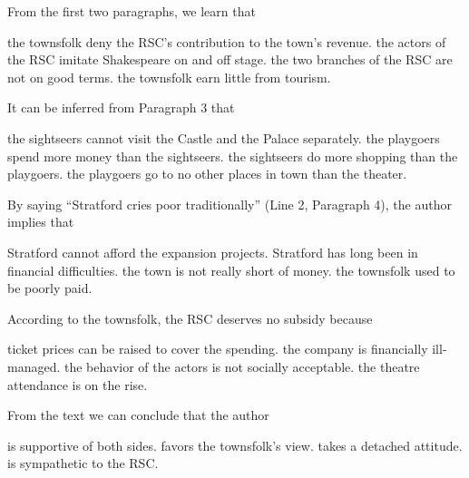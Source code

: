 \item From the first two paragraphs, we learn that
\begin{tasks}
	\task the townsfolk deny the RSC's contribution to the town's revenue.
	\task the actors of the RSC imitate Shakespeare on and off stage.
	\task the two branches of the RSC are not on good terms.
	\task the townsfolk earn little from tourism.
\end{tasks}
\item It can be inferred from Paragraph 3 that
\begin{tasks}
	\task the sightseers cannot visit the Castle and the Palace separately.
	\task the playgoers spend more money than the sightseers.
	\task the sightseers do more shopping than the playgoers.
	\task the playgoers go to no other places in town than the theater.
\end{tasks}
\item By saying ``Stratford cries poor traditionally'' (Line 2, Paragraph 4), the author implies that
\begin{tasks}
	\task Stratford cannot afford the expansion projects.
	\task Stratford has long been in financial difficulties.
	\task the town is not really short of money.
	\task the townsfolk used to be poorly paid.
\end{tasks}
\item According to the townsfolk, the RSC deserves no subsidy because
\begin{tasks}
	\task ticket prices can be raised to cover the spending.
	\task the company is financially ill-managed.
	\task the behavior of the actors is not socially acceptable.
	\task the theatre attendance is on the rise.
\end{tasks}
\item From the text we can conclude that the author
\begin{tasks}
	\task is supportive of both sides.
	\task favors the townsfolk's view.
	\task takes a detached attitude.
	\task is sympathetic to the RSC.
\end{tasks}